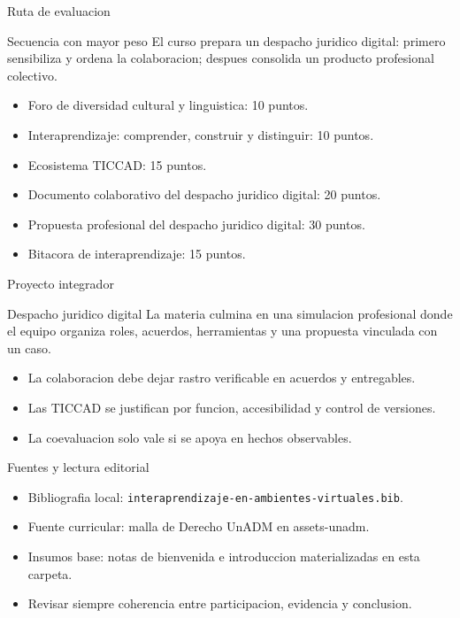 \documentclass[
  spanish,
  aspectratio=169,
  xcolor={dvipsnames,table}
]{beamer}
\begin{document}
\begin{frame}{Ruta de evaluacion}
  \begin{block}{Secuencia con mayor peso}
    El curso prepara un despacho juridico digital: primero sensibiliza y ordena
    la colaboracion; despues consolida un producto profesional colectivo.
  \end{block}
  \begin{itemize}
    \item Foro de diversidad cultural y linguistica: 10 puntos.
    \item Interaprendizaje: comprender, construir y distinguir: 10 puntos.
    \item Ecosistema TICCAD: 15 puntos.
    \item Documento colaborativo del despacho juridico digital: 20 puntos.
    \item Propuesta profesional del despacho juridico digital: 30 puntos.
    \item Bitacora de interaprendizaje: 15 puntos.
  \end{itemize}
\end{frame}

\begin{frame}{Proyecto integrador}
  \begin{block}{Despacho juridico digital}
    La materia culmina en una simulacion profesional donde el equipo organiza
    roles, acuerdos, herramientas y una propuesta vinculada con un caso.
  \end{block}
  \begin{itemize}
    \item La colaboracion debe dejar rastro verificable en acuerdos y entregables.
    \item Las TICCAD se justifican por funcion, accesibilidad y control de versiones.
    \item La coevaluacion solo vale si se apoya en hechos observables.
  \end{itemize}
\end{frame}

\begin{frame}{Fuentes y lectura editorial}
  \begin{itemize}
    \item Bibliografia local: \texttt{interaprendizaje-en-ambientes-virtuales.bib}.
    \item Fuente curricular: malla de Derecho UnADM en assets-unadm.
    \item Insumos base: notas de bienvenida e introduccion materializadas en esta carpeta.
    \item Revisar siempre coherencia entre participacion, evidencia y conclusion.
  \end{itemize}
\end{frame}
\end{document}
